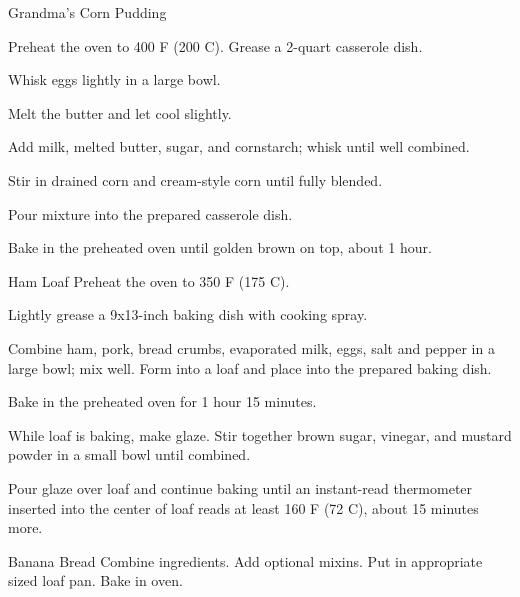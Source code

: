 \documentclass[letterpaper]{book}
\begin{document}
\begin{recipe}{Grandma's Corn Pudding}{}{}

    \newstep
    Preheat the oven to 400\0 F (200\0 C). Grease a 2-quart casserole dish.

    Whisk eggs lightly in a large bowl.

    Melt the butter and let cool slightly.

    Add milk, melted butter, sugar, and cornstarch; whisk until well combined.

    Stir in drained corn and cream-style corn until fully blended.

    \newstep
    Pour mixture into the prepared casserole dish.

    \newstep
    Bake in the preheated oven until golden brown on top, about 1 hour.
\end{recipe}

\begin{recipe}{Ham Loaf}{}{}
    \newstep
    Preheat the oven to 350\0 F (175\0 C).

    Lightly grease a 9x13-inch baking dish with cooking spray.

    Combine ham, pork, bread crumbs, evaporated milk, eggs, salt and pepper in a large bowl; mix well.
    Form into a loaf and place into the prepared baking dish.

    \newstep
    Bake in the preheated oven for 1 hour 15 minutes.

    While loaf is baking, make glaze.
    Stir together brown sugar, vinegar, and mustard powder in a small bowl until combined.

    \newstep
    Pour glaze over loaf and continue baking until an instant-read thermometer inserted into the center of loaf reads at least 160\0 F (72\0 C), about 15 minutes more.
\end{recipe}

\begin{recipe}{Banana Bread}{}{}
    Combine ingredients.
    Add optional mixins.
    \newstep
    Put in appropriate sized loaf pan.
    \newstep
    Bake in oven.
\end{recipe}
\end{document}
